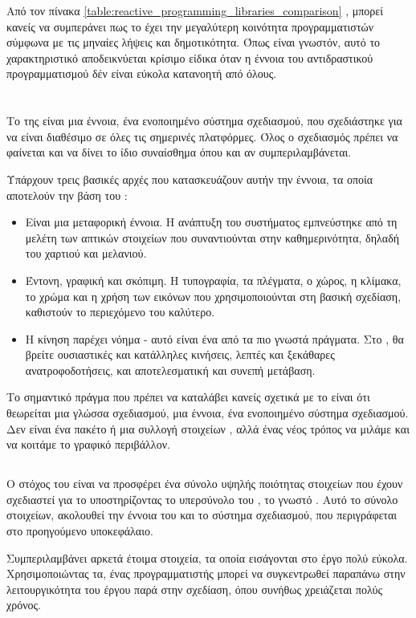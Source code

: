 Από τον πίνακα \ref{table:reactive_programming_libraries_comparison} , μπορεί κανείς να συμπεράνει πως το  έχει την μεγαλύτερη κοινότητα προγραμματιστών σύμφωνα με τις μηναίες λήψεις και δημοτικότητα. Όπως είναι γνωστόν, αυτό το χαρακτηριστικό αποδεικνύεται κρίσιμο είδικα όταν η έννοια του αντιδραστικού προγραμματισμού δέν είναι εύκολα κατανοητή από όλους.

\section{}
\quad Το  της  είναι μια έννοια, ένα ενοποιημένο σύστημα σχεδιασμού, που σχεδιάστηκε για να είναι διαθέσιμο σε όλες τις σημερινές πλατφόρμες. Όλος ο σχεδιασμός πρέπει να φαίνεται και να δίνει το ίδιο συναίσθημα όπου και αν συμπεριλαμβάνεται.

Υπάρχουν τρεις βασικές αρχές που κατασκευάζουν αυτήν την έννοια, τα οποία αποτελούν την βάση του :

\begin{itemize}
    \item Είναι μια μεταφορική έννοια. Η ανάπτυξη του συστήματος εμπνεύστηκε από τη μελέτη των απτικών στοιχείων που συναντιούνται στην καθημερινότητα, δηλαδή του χαρτιού και μελανιού. 
    \item Έντονη, γραφική και σκόπιμη. Η τυπογραφία, τα πλέγματα, ο χώρος, η κλίμακα, το χρώμα και η χρήση των εικόνων που χρησιμοποιούνται στη βασική σχεδίαση, καθιστούν το περιεχόμενο του  καλύτερο.
    \item Η κίνηση παρέχει νόημα - αυτό είναι ένα από τα πιο γνωστά πράγματα. Στο , θα βρείτε ουσιαστικές και κατάλληλες κινήσεις, λεπτές και ξεκάθαρες ανατροφοδοτήσεις, και αποτελεσματική και συνεπή μετάβαση.
\end{itemize}

Το σημαντικό πράγμα που πρέπει να καταλάβει κανείς σχετικά με το  είναι ότι θεωρείται μια γλώσσα σχεδιασμού, μια έννοια, ένα ενοποιημένο σύστημα σχεδιασμού. Δεν είναι ένα πακέτο  ή μια συλλογή στοιχείων , αλλά ένας νέος τρόπος να μιλάμε και να κοιτάμε το γραφικό περιβάλλον.

\subsection*{}
\quad Ο στόχος του είναι να προσφέρει ένα σύνολο υψηλής ποιότητας στοιχείων  που έχουν σχεδιαστεί για το  υποστηρίζοντας το υπερσύνολο του , το γνωστό . Αυτό το σύνολο στοιχείων, ακολουθεί την έννοια του  και το σύστημα σχεδιασμού, που περιγράφεται στο προηγούμενο υποκεφάλαιο.\par
Συμπεριλαμβάνει αρκετά έτοιμα στοιχεία, τα οποία εισάγονται στο έργο πολύ εύκολα. Χρησιμοποιώντας τα, ένας προγραμματιστής μπορεί να συγκεντρωθεί παραπάνω στην λειτουργικότητα του έργου παρά στην σχεδίαση, όπου συνήθως χρειάζεται πολύς χρόνος.\par

